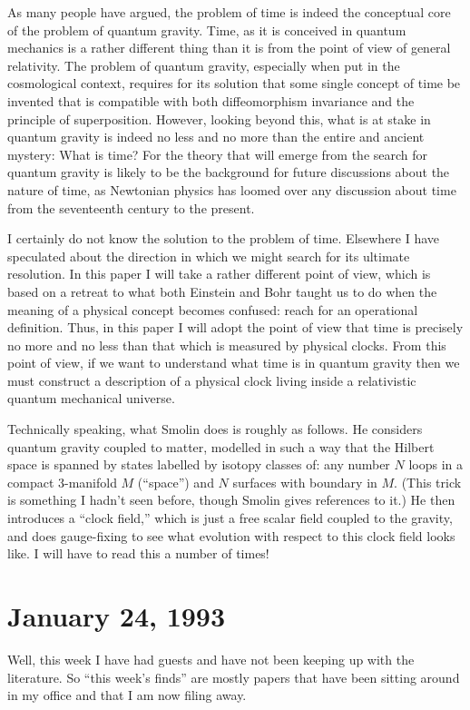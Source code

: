 \documentclass{article}
\begin{document}
As many people have argued, the problem of time is indeed the conceptual
core of the problem of quantum gravity. Time, as it is conceived in
quantum mechanics is a rather different thing than it is from the point
of view of general relativity. The problem of quantum gravity,
especially when put in the cosmological context, requires for its
solution that some single concept of time be invented that is compatible
with both diffeomorphism invariance and the principle of superposition.
However, looking beyond this, what is at stake in quantum gravity is
indeed no less and no more than the entire and ancient mystery: What is
time? For the theory that will emerge from the search for quantum
gravity is likely to be the background for future discussions about the
nature of time, as Newtonian physics has loomed over any discussion
about time from the seventeenth century to the present.

I certainly do not know the solution to the problem of time. Elsewhere I
have speculated about the direction in which we might search for its
ultimate resolution. In this paper I will take a rather different point
of view, which is based on a retreat to what both Einstein and Bohr
taught us to do when the meaning of a physical concept becomes confused:
reach for an operational definition. Thus, in this paper I will adopt
the point of view that time is precisely no more and no less than that
which is measured by physical clocks. From this point of view, if we
want to understand what time is in quantum gravity then we must
construct a description of a physical clock living inside a relativistic
quantum mechanical universe.

Technically speaking, what Smolin does is roughly as follows. He
considers quantum gravity coupled to matter, modelled in such a way that
the Hilbert space is spanned by states labelled by isotopy classes of:
any number \(N\) loops in a compact 3-manifold \(M\) (``space'') and
\(N\) surfaces with boundary in \(M\). (This trick is something I hadn't
seen before, though Smolin gives references to it.) He then introduces a
``clock field,'' which is just a free scalar field coupled to the
gravity, and does gauge-fixing to see what evolution with respect to
this clock field looks like. I will have to read this a number of times!
\hypertarget{week2}{%
\section{January 24, 1993}\label{week2}}

Well, this week I have had guests and have not been keeping up with the
literature. So ``this week's finds'' are mostly papers that have been
sitting around in my office and that I am now filing away.
\end{document}
